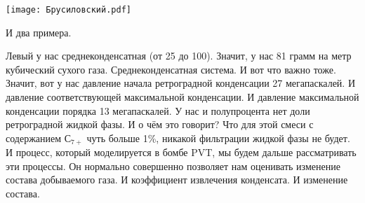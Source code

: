\documentclass[main.tex]{subfiles}
\begin{document}
\begin{center}
\texttt{[image: Брусиловский.pdf]}
\end{center}

И два примера.

Левый у нас среднеконденсатная (от 25 до 100).
Значит, у нас 81 грамм на метр кубический сухого газа.
Среднеконденсатная система.
И вот что важно тоже.
Значит, вот у нас давление начала ретроградной конденсации 27 мегапаскалей.
И давление соответствующей максимальной конденсации.
И давление максимальной конденсации порядка 13 мегапаскалей.
У нас и полупроцента нет доли ретроградной жидкой фазы.
И о чём это говорит?
Что для этой смеси с содержанием $С_{7+}$ чуть больше 1\%, никакой фильтрации жидкой фазы не будет.
И процесс, который моделируется в бомбе PVT, мы будем дальше рассматривать эти процессы.
Он нормально совершенно позволяет нам оценивать изменение состава добываемого газа.
И коэффициент извлечения конденсата.
И изменение состава.
\end{document}
